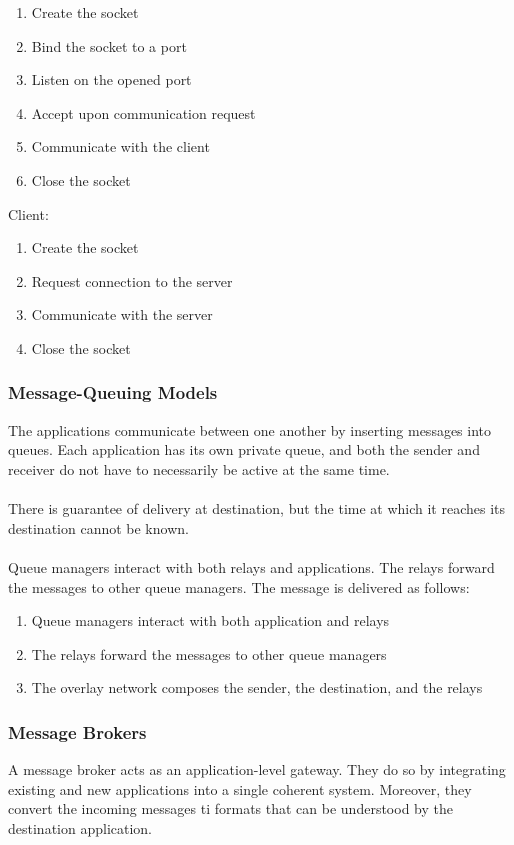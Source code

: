 \documentclass{article}
\begin{document}
\begin{enumerate}
	\item Create the socket
	\item Bind the socket to a port
	\item Listen on the opened port
	\item Accept upon communication request
	\item Communicate with the client
	\item Close the socket
\end{enumerate}

\noindent Client:

\begin{enumerate}
	\item Create the socket
	\item Request connection to the server
	\item Communicate with the server
	\item Close the socket
\end{enumerate}

\subsubsection{Message-Queuing Models}
The applications communicate between one another by inserting messages into queues. Each application has its own private queue, and both the sender and receiver do not have to necessarily be active at the same time. \\ \\
There is guarantee of delivery at destination, but the time at which it reaches its destination cannot be known. \\ \\
Queue managers interact with both relays and applications. The relays forward the messages to other queue managers. The message is delivered as follows:

\begin{enumerate}
	\item Queue managers interact with both application and relays
	\item The relays forward the messages to other queue managers
	\item The overlay network composes the sender, the destination, and the relays
\end{enumerate}

\subsubsection{Message Brokers}
A message broker acts as an application-level gateway. They do so by integrating existing and new applications into a single coherent system. Moreover, they convert the incoming messages ti formats that can be understood by the destination application.
\end{document}
